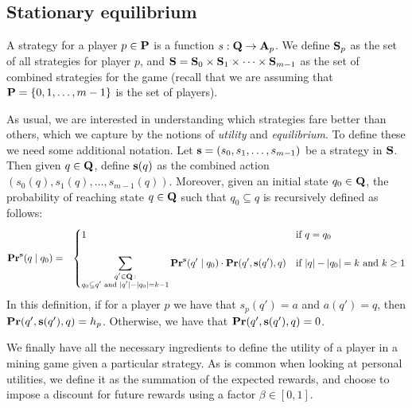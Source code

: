 \subsection{Stationary equilibrium}
A strategy for a player $p \in \mathbf{P}$ is a function $s : \mathbf{Q} \rightarrow \mathbf{A}_p$. 
We define $\mathbf{S}_p$ as the set of all strategies for player $p$, and $\mathbf{S} = \mathbf{S}_0 \times \mathbf{S}_{1} \times \cdots \times \mathbf{S}_{m-1}$ as the set of combined strategies for the game (recall that we are assuming that $\mathbf{P} = \{0, 1, \ldots, m-1\}$ is the set of players). 

As usual, we are interested in understanding which strategies fare better than others, which we capture by the notions of 
\emph{utility} and \emph{equilibrium}. To define these we need some additional notation. 
Let $\mathbf{s} = (s_0, s_1, \ldots, s_{m-1})$ be a strategy in $\mathbf{S}$. Then given $q \in \mathbf{Q}$, define $\mathbf{s}(q)$ as the combined action $(s_0(q), s_1(q), \ldots, s_{m-1}(q))$. Moreover, given an initial state $q_0 \in \mathbf{Q}$, 
the probability of reaching state $q \in \mathbf{Q}$ such that $q_0 \subseteq q$ is recursively defined as follows:
\begin{eqnarray*}
\mathbf{Pr}^{\mathbf{s}}(q \mid q_0) & = &
\begin{cases}
1 & \text{if } q =  q_0\\
& \\
{\displaystyle \sum_{\substack{q' \in \mathbf{Q} \,:\\ q_0 \subseteq q' \text{ and } |q'| - |q_0| = k-1}} \mathbf{Pr}^{\mathbf{s}}(q' \mid q_0) \cdot \mathbf{Pr}(q', \mathbf{s}(q'), q)}
 & \text{if } |q| - |q_0| = k \text{ and } k \geq 1
\end{cases}
\end{eqnarray*}
In this definition, if for a player $p$ we have that $s_p(q') = a$ and $a(q') = q$, then $\mathbf{Pr}(q', \mathbf{s}(q'), q) = h_p$. Otherwise, we have that $\mathbf{Pr}(q', \mathbf{s}(q'), q) = 0$. 

We finally have all the necessary ingredients to define the utility of a player in a mining game given a particular strategy. As is common 
when looking at personal utilities, we define it as the summation of the expected rewards, and choose 
to impose a discount for future rewards using a factor $\beta \in [0,1]$. 


